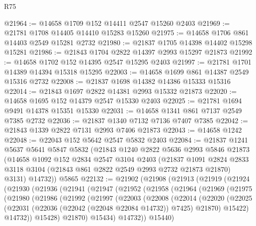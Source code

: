 \begin{lexlean}{R75}
\begin{coremodule}
@21964 := @14658 @1709 @152 @14411 @2547 @15260 @2403
@21969 := @21781 @1708 @14405 @14410 @15283 @15260
@21975 := @14658 @1706 @861 @14403 @2549 @15281 @2732
@21980 := @21837 @1705 @14398 @14402 @15298 @15281
@21986 := @21843 @1704 @2822 @14397 @2993 @15297 @21873
@21992 := @14658 @1702 @152 @14395 @2547 @15295 @2403
@21997 := @21781 @1701 @14389 @14394 @15318 @15295
@22003 := @14658 @1699 @861 @14387 @2549 @15316 @2732
@22008 := @21837 @1698 @14382 @14386 @15333 @15316
@22014 := @21843 @1697 @2822 @14381 @2993 @15332 @21873
@22020 := @14658 @1695 @152 @14379 @2547 @15330 @2403
@22025 := @21781 @1694 @9491 @14378 @15351 @15330
@22031 := @14658 @1341 @861 @7137 @2549 @7385 @2732
@22036 := @21837 @1340 @7132 @7136 @7407 @7385
@22042 := @21843 @1339 @2822 @7131 @2993 @7406 @21873
@22043 := @14658 @1242
@22048 := @22043 @152 @5642 @2547 @5832 @2403
@22084 := @21837
    @1241
    @5637
    @5641
    @5847
    @5832
    (@21843
      @1240
      @2822
      @5636
      @2993
      @5846
      @21873
      (@14658
        @1092
        @152
        @2834
        @2547
        @3104
        @2403
        (@21837
          @1091
          @2824
          @2833
          @3118
          @3104
          (@21843 @861 @2822 @2549 @2993 @2732 @21873 @21870)
          @3131)
        @14732))
    @5865
@22132 := @21902
    (@21908
      (@21913
        (@21919
          (@21924
            (@21930
              (@21936
                (@21941
                  (@21947
                    (@21952
                      (@21958
                        (@21964
                          (@21969
                            (@21975
                              (@21980
                                (@21986
                                  (@21992
                                    (@21997
                                      (@22003
                                        (@22008
                                          (@22014
                                            (@22020
                                              (@22025
                                                (@22031
                                                  (@22036 (@22042 (@22048 @22084 @14732)) @7425)
                                                  @21870)
                                                @15422)
                                              @14732))
                                          @15428)
                                        @21870)
                                      @15434)
                                    @14732))
                                @15440)

\end{coremodule}
\end{lexlean}
